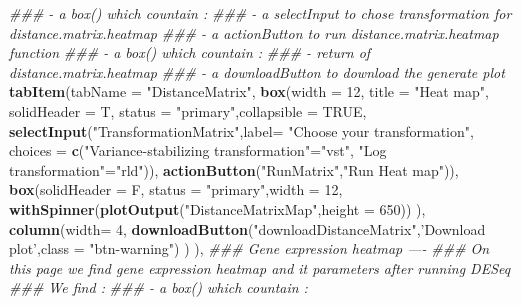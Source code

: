 \documentclass[
  12pt,
]{article}
\newenvironment{Shaded}{\begin{snugshade}}{\end{snugshade}}
\newcommand{\CommentTok}[1]{\textcolor[rgb]{0.56,0.35,0.01}{\textit{#1}}}
\newcommand{\DataTypeTok}[1]{\textcolor[rgb]{0.13,0.29,0.53}{#1}}
\newcommand{\DecValTok}[1]{\textcolor[rgb]{0.00,0.00,0.81}{#1}}
\newcommand{\KeywordTok}[1]{\textcolor[rgb]{0.13,0.29,0.53}{\textbf{#1}}}
\newcommand{\NormalTok}[1]{#1}
\newcommand{\OtherTok}[1]{\textcolor[rgb]{0.56,0.35,0.01}{#1}}
\newcommand{\StringTok}[1]{\textcolor[rgb]{0.31,0.60,0.02}{#1}}
\begin{document}
\begin{Shaded}
\begin{Highlighting}[]
            \CommentTok{###     - a box() which countain :}
            \CommentTok{###         - a selectInput to chose transformation for distance.matrix.heatmap }
            \CommentTok{###         - a actionButton to run distance.matrix.heatmap function}
            \CommentTok{###     - a box() which countain :}
            \CommentTok{###         - return of distance.matrix.heatmap}
            \CommentTok{###     - a downloadButton to download  the generate plot}
            \KeywordTok{tabItem}\NormalTok{(}\DataTypeTok{tabName =} \StringTok{"DistanceMatrix"}\NormalTok{,}
                    \KeywordTok{box}\NormalTok{(}\DataTypeTok{width =} \DecValTok{12}\NormalTok{,}
                        \DataTypeTok{title =} \StringTok{"Heat map"}\NormalTok{, }\DataTypeTok{solidHeader =}\NormalTok{ T, }\DataTypeTok{status =} \StringTok{"primary"}\NormalTok{,}\DataTypeTok{collapsible =} \OtherTok{TRUE}\NormalTok{,}
                        \KeywordTok{selectInput}\NormalTok{(}\StringTok{"TransformationMatrix"}\NormalTok{,}\DataTypeTok{label=} \StringTok{"Choose your transformation"}\NormalTok{,}
                                    \DataTypeTok{choices =} \KeywordTok{c}\NormalTok{(}\StringTok{"Variance-stabilizing transformation"}\NormalTok{=}\StringTok{"vst"}\NormalTok{,}
                                                \StringTok{"Log transformation"}\NormalTok{=}\StringTok{"rld"}\NormalTok{)),}
                        \KeywordTok{actionButton}\NormalTok{(}\StringTok{"RunMatrix"}\NormalTok{,}\StringTok{"Run Heat map"}\NormalTok{)),}
                    \KeywordTok{box}\NormalTok{(}\DataTypeTok{solidHeader =}\NormalTok{ F, }\DataTypeTok{status =} \StringTok{"primary"}\NormalTok{,}\DataTypeTok{width =} \DecValTok{12}\NormalTok{,}
                        \KeywordTok{withSpinner}\NormalTok{(}\KeywordTok{plotOutput}\NormalTok{(}\StringTok{"DistanceMatrixMap"}\NormalTok{,}\DataTypeTok{height =} \DecValTok{650}\NormalTok{))}
\NormalTok{                    ),}
                    \KeywordTok{column}\NormalTok{(}\DataTypeTok{width=} \DecValTok{4}\NormalTok{,}
                           \KeywordTok{downloadButton}\NormalTok{(}\StringTok{"downloadDistanceMatrix"}\NormalTok{,}\StringTok{'Download plot'}\NormalTok{,}\DataTypeTok{class =} \StringTok{"btn-warning"}\NormalTok{)}
\NormalTok{                    )}
\NormalTok{            ),}
            \CommentTok{### Gene expression heatmap ----}
            \CommentTok{### On this page we find gene expression heatmap and it parameters after running DESeq}
            \CommentTok{### We find :}
            \CommentTok{###     - a box() which countain :}

\end{Highlighting}
\end{Shaded}
\end{document}

